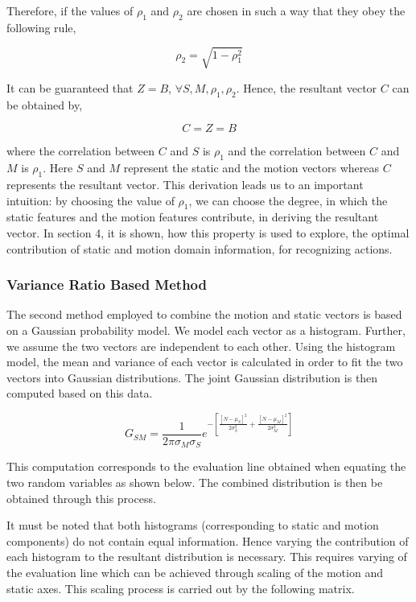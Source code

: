 Therefore, if the values of $\rho_{1}$ and $\rho_{2}$ are chosen in such a way that they obey the following
rule,

\begin{equation}
\rho_{2} = \sqrt{1-\rho_{1}^2}
\end{equation}

It can be guaranteed that $Z = B$, $\forall S,M,\rho_{1},\rho_{2}$. Hence, the resultant vector $C$ can be obtained
by,

\begin{equation}
C=Z=B
\end{equation}

where the correlation between $C$ and $S$ is $\rho_{1}$ and the correlation between $C$ and $M$ is $\rho_{1}$. Here $S$ and $M$ represent the static and the
motion vectors whereas $C$ represents the resultant vector. This derivation
leads us to an important intuition: by choosing the value of $\rho_{1}$, we can
choose the degree, in which the static features and the motion features contribute,
in deriving the resultant vector. In section 4, it is shown, how this property is used to explore, the optimal contribution of
static and motion domain information, for recognizing actions.

\subsubsection{Variance Ratio Based Method}

The second method employed to combine the motion and static vectors is based on a Gaussian probability model. We model each vector as a histogram. Further, we assume the two vectors are independent to each other. Using the histogram model, the mean and variance of each vector is calculated in order to fit the two vectors into Gaussian distributions. The joint Gaussian distribution is then computed based on this data.

\begin{equation}
G_{SM}= \frac{1}{2\pi\sigma_M\sigma_S} e^{-\left[\frac{[N-\mu_S]^2}{2\sigma_S^2}+ \frac{[N-\mu_M]^2}{2\sigma_M^2} \right]}
\end{equation}

This computation corresponds to the evaluation line obtained when equating the two random variables as shown below. The combined distribution is then be obtained through this process.

It must be noted that both histograms (corresponding to static and motion components) do not contain equal information. Hence varying the contribution of each histogram to the resultant distribution is necessary. This requires varying of the evaluation line which can be achieved through scaling of the motion and static axes. This scaling process is carried out by the following matrix.


